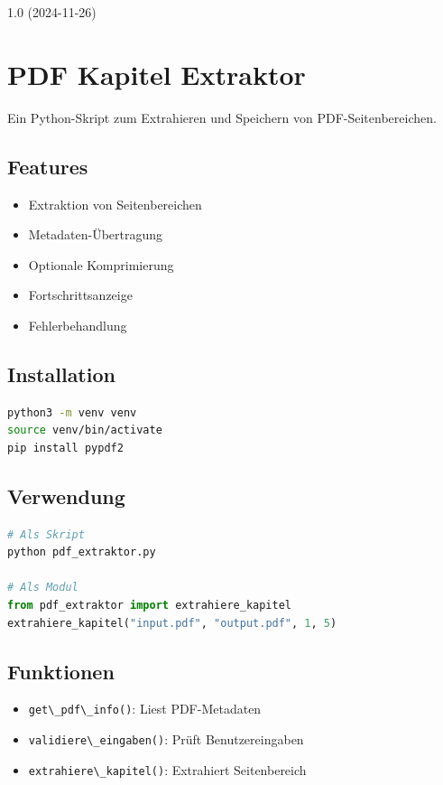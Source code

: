 \documentclass{vorlage-design-main}
\begin{document}
1.0 (2024-11-26)

\section{PDF Kapitel Extraktor}\label{pdf-kapitel-extraktor}

Ein Python-Skript zum Extrahieren und Speichern von PDF-Seitenbereichen.

\subsection{Features}\label{features-2}

\begin{itemize}

\item
  Extraktion von Seitenbereichen
\item
  Metadaten-Übertragung
\item
  Optionale Komprimierung
\item
  Fortschrittsanzeige
\item
  Fehlerbehandlung
\end{itemize}

\subsection{Installation}\label{installation-1}

\begin{lstlisting}[language=bash]
python3 -m venv venv
source venv/bin/activate
pip install pypdf2
\end{lstlisting}

\subsection{Verwendung}\label{verwendung-3}

\begin{lstlisting}[language=Python]
# Als Skript
python pdf_extraktor.py

# Als Modul
from pdf_extraktor import extrahiere_kapitel
extrahiere_kapitel("input.pdf", "output.pdf", 1, 5)
\end{lstlisting}

\subsection{Funktionen}\label{funktionen}

\begin{itemize}

\item
  \verb|get\_pdf\_info()|: Liest PDF-Metadaten
\item
  \verb|validiere\_eingaben()|: Prüft
  Benutzereingaben
\item
  \verb|extrahiere\_kapitel()|: Extrahiert
  Seitenbereich
\end{itemize}
\end{document}
